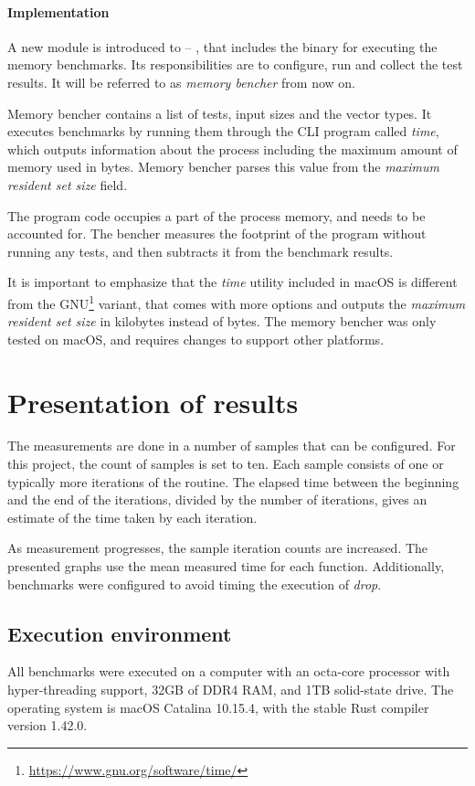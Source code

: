 \paragraph{Implementation}
A new module is introduced to \pvecrs{} -- , that includes the binary for executing the memory benchmarks. Its responsibilities are to configure, run and collect the test results. It will be referred to as \emph{memory bencher} from now on. 

Memory bencher contains a list of tests, input sizes and the vector types. It executes benchmarks by running them through the CLI program called \emph{time}, which outputs information about the process including the maximum amount of memory used in bytes. Memory bencher parses this value from the \emph{maximum resident set size} field.

The program code occupies a part of the process memory, and needs to be accounted for. The bencher measures the footprint of the program without running any tests, and then subtracts it from the benchmark results.

It is important to emphasize that the \emph{time} utility included in macOS is different from the GNU\footnote{\url{https://www.gnu.org/software/time/}} variant, that comes with more options and outputs the \emph{maximum resident set size} in kilobytes instead of bytes. The memory bencher was only tested on macOS, and requires changes to support other platforms.

\section{Presentation of results}
The measurements are done in a number of samples that can be configured. For this project, the count of samples is set to ten. Each sample consists of one or typically more iterations of the routine. The elapsed time between the beginning and the end of the iterations, divided by the number of iterations, gives an estimate of the time taken by each iteration.

As measurement progresses, the sample iteration counts are increased. The presented graphs use the mean measured time for each function. Additionally, benchmarks were configured to avoid timing the execution of \emph{drop}.

\subsection{Execution environment}
All benchmarks were executed on a computer with an octa-core processor with hyper-threading support, 32GB of DDR4 RAM, and 1TB solid-state drive. The operating system is macOS Catalina 10.15.4, with the stable Rust compiler version 1.42.0.

